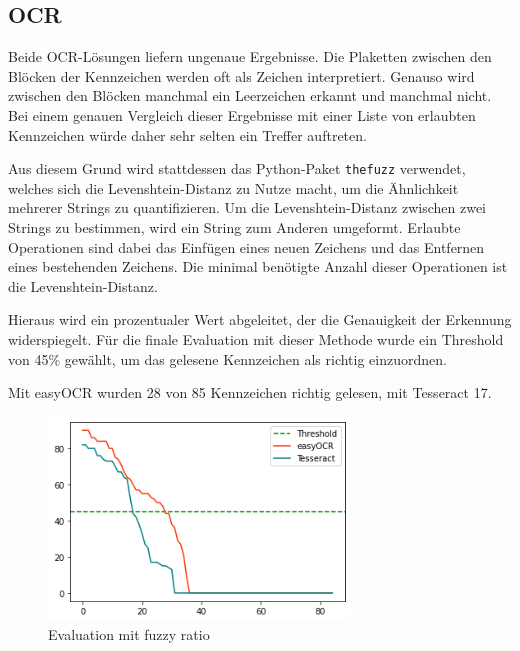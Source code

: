 \subsection{OCR}
Beide OCR-Lösungen liefern ungenaue Ergebnisse. Die Plaketten zwischen den Blöcken der Kennzeichen werden oft als Zeichen interpretiert. Genauso wird zwischen den Blöcken manchmal ein Leerzeichen erkannt und manchmal nicht.
Bei einem genauen Vergleich dieser Ergebnisse mit einer Liste von erlaubten Kennzeichen würde daher sehr selten ein Treffer auftreten.

Aus diesem Grund wird stattdessen das Python-Paket \lstinline{thefuzz} verwendet, welches sich die Levenshtein-Distanz zu Nutze macht, um die Ähnlichkeit mehrerer Strings zu quantifizieren.
Um die Levenshtein-Distanz zwischen zwei Strings zu bestimmen, wird ein String zum Anderen umgeformt. Erlaubte Operationen sind dabei das Einfügen eines neuen Zeichens und das Entfernen eines bestehenden Zeichens.
Die minimal benötigte Anzahl dieser Operationen ist die Levenshtein-Distanz.

Hieraus wird ein prozentualer Wert abgeleitet, der die Genauigkeit der Erkennung widerspiegelt.
Für die finale Evaluation mit dieser Methode wurde ein Threshold von 45\% gewählt, um das gelesene Kennzeichen als richtig einzuordnen.

Mit easyOCR wurden 28 von 85 Kennzeichen richtig gelesen, mit Tesseract 17.
\begin{figure}[H]
		\centering
\includegraphics[width=8cm]{./img/evaluation_fuzzy_ratio.png}
\caption{Evaluation mit fuzzy ratio}
\end{figure}


